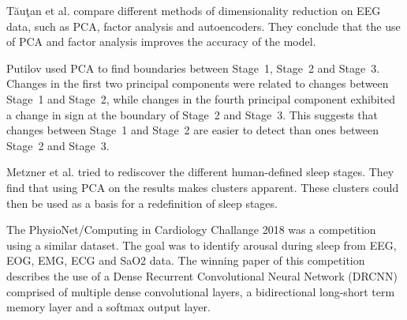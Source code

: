 Tăuţan et al.\cite{Tautan2021} compare different methods of dimensionality reduction on EEG data, such as PCA, factor analysis and autoencoders. They conclude that the use of PCA and factor analysis improves the accuracy of the model.

Putilov\cite{Putilov2015} used PCA to find boundaries between Stage~1, Stage~2 and Stage~3. Changes in the first two principal components were related to changes between Stage~1 and Stage~2, while changes in the fourth principal component exhibited a change in sign at the boundary of Stage~2 and Stage~3. This suggests that changes between Stage~1 and Stage~2 are easier to detect than ones between Stage~2 and Stage~3.

Metzner et al.\cite{Metzner2023} tried to rediscover the different human-defined sleep stages. They find that using PCA on the results makes clusters apparent. These clusters could then be used as a basis for a redefinition of sleep stages.

The PhysioNet/Computing in Cardiology Challange 2018\cite{Ghassemi2018} was a competition using a similar dataset. The goal was to identify arousal during sleep from EEG, EOG, EMG, ECG and SaO2 data. The winning paper\cite{Howe2018} of this competition describes the use of a Dense Recurrent Convolutional Neural Network (DRCNN) comprised of multiple dense convolutional layers, a bidirectional long-short term memory layer and a softmax output layer.
